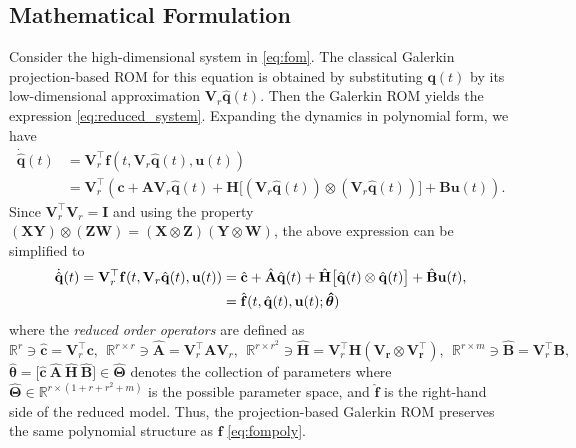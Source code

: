 \subsection*{Mathematical Formulation}
Consider the high-dimensional system in \eqref{eq:fom}. The classical Galerkin projection-based ROM for this equation is obtained by substituting $\mathbf{q}(t)$ by its low-dimensional approximation $\mathbf{V}_r\hat{\mathbf{q}}(t)$. Then the Galerkin ROM yields the expression \eqref{eq:reduced_system}. Expanding the dynamics in polynomial form, we have\\
\begin{align*}
    \dot{\hat{\mathbf{q}}}(t) &= \mathbf{V}_r^{\top}\mathbf{f}(t, \mathbf{V}_r\hat{\mathbf{q}}(t), \mathbf{u}(t))\\
    &= \mathbf{V}_r^{\top}\left( \mathbf{c} + \mathbf{A}\mathbf{V}_r\hat{\mathbf{q}}(t) + \mathbf{H}\bigl[(\mathbf{V}_r\hat{\mathbf{q}}(t)) \otimes (\mathbf{V}_r\hat{\mathbf{q}}(t))\bigr] + \mathbf{B}\mathbf{u}(t) \right).
\end{align*}
Since $\mathbf{V}_r^{\top}\mathbf{V}_r^{} = \mathbf{I}$ and using the property $(\mathbf{XY})\otimes(\mathbf{ZW})=(\mathbf{X}\otimes\mathbf{Z})(\mathbf{Y}\otimes\mathbf{W})$, the above expression can be simplified to\\
\begin{align}
    \dot{\hat{\mathbf{q}}}(t) = \mathbf{V}_r^{\top}\mathbf{f}(t, \mathbf{V}_r\hat{\mathbf{q}}(t), \mathbf{u}(t)) &= \hat{\mathbf{c}} + \hat{\mathbf{A}}\hat{\mathbf{q}}(t) + \hat{\mathbf{H}}\bigl[ \hat{\mathbf{q}}(t)\otimes\hat{\mathbf{q}}(t)\bigr] + \hat{\mathbf{B}}\mathbf{u}(t),\notag \\
    &= \hat{\mathbf{f}}(t, \hat{\mathbf{q}}(t),\mathbf{u}(t);\bm{\hat{\theta}})
    \label{eq:redopinf}
\end{align}
where the \textit{reduced order operators} are defined as\\$$\mathbb{R}^r \ni\hat{\mathbf{c}}=\mathbf{V}_r^{\top}\mathbf{c},~~\mathbb{R}^{r\times r} \ni\hat{\mathbf{A}}=\mathbf{V}_r^{\top}\mathbf{A}\mathbf{V}_r^{},~~\mathbb{R}^{r\times r^2} \ni\hat{\mathbf{H}}=\mathbf{V}_r^{\top}\mathbf{H(\mathbf{V}_r^{}\otimes\mathbf{V}_r^{\top})},~~\mathbb{R}^{r\times m} \ni\hat{\mathbf{B}}=\mathbf{V}_r^{\top}\mathbf{B},$$ $\bm{\hat{\theta}}=\bigl[ \hat{\mathbf{c}}~\hat{\mathbf{A}}~\hat{\mathbf{H}}~\hat{\mathbf{B}} \bigr] \in\bm{\hat{\Theta}}$ denotes the collection of parameters where $\bm{\hat{\Theta}}\in\mathbb{R}^{r\times (1+r+r^2+m)}$ is the possible parameter space, and $\hat{\mathbf{f}}$ is the right-hand side of the reduced model. Thus, the projection-based Galerkin ROM preserves the same polynomial structure as $\mathbf{f}$ \eqref{eq:fompoly}.

